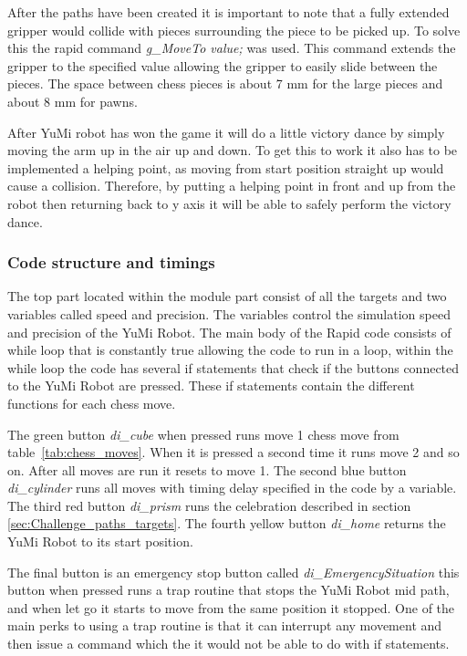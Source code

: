 \documentclass[a4paper,12pt]{article}
\begin{document}
After the paths have been created it is important to note that a fully extended gripper would collide with pieces surrounding the piece to be picked up. To solve this the rapid command \textit{g\_MoveTo value;} was used. This command extends the gripper to the specified value allowing the gripper to easily slide between the pieces. The space between chess pieces is about 7 mm for the large pieces and about 8 mm for pawns.

After YuMi robot has won the game it will do a little victory dance by simply moving the arm up in the air up and down. To get this to work it also has to be implemented a helping point, as moving from start position straight up would cause a collision. Therefore, by putting a helping point in front and up from the robot then returning back to y axis it will be able to safely perform the victory dance. 

\subsubsection{Code structure and timings}
The top part located within the module part consist of all the targets and two variables called speed and precision. The variables control the simulation speed and precision of the YuMi Robot. The main body of the Rapid code consists of while loop that is constantly true allowing the code to run in a loop, within the while loop the code has several if statements that check if the buttons connected to the YuMi Robot are pressed. These if statements contain the different functions for each chess move.

The green button \textit{di\_cube} when pressed runs move 1 chess move from table~\ref{tab:chess_moves}. When it is pressed a second time it runs move 2 and so on. After all moves are run it resets to move 1. The second blue button \textit{di\_cylinder} runs all moves with timing delay specified in the code by a variable. The third red button \textit{di\_prism} runs the celebration described in section \ref{sec:Challenge_paths_targets}. The fourth yellow button \textit{di\_home} returns the YuMi Robot to its start position.

The final button is an emergency stop button called \textit{di\_EmergencySituation} this button when pressed runs a trap routine that stops the YuMi Robot mid path, and when let go it starts to move from the same position it stopped. One of the main perks to using a trap routine is that it can interrupt any movement and then issue a command which the it would not be able to do with if statements.
\end{document}
